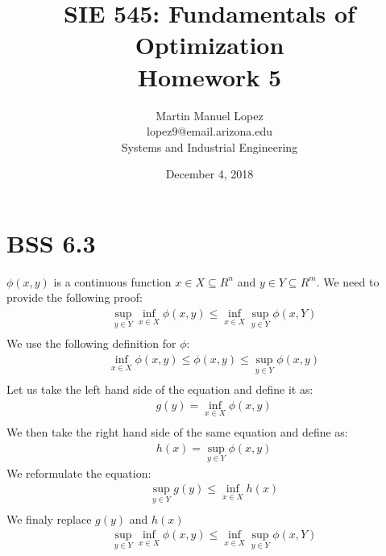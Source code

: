 \documentclass[12pt]{article}
\begin{document}
\title{SIE 545: Fundamentals of Optimization \\Homework 5}
\author{Martin Manuel Lopez \\lopez9@email.arizona.edu \\Systems and Industrial Engineering}
\date{December 4, 2018}
\maketitle
\section{BSS 6.3}
    $\phi(x,y)$ is a continuous function $x \in X \subseteq R^n $ and $y \in Y \subseteq R^m$. We need to provide the following proof:\\
        \begin{align*}
            &\sup_{y \in Y} \inf_{x \in X} \phi(x,y) \leq \inf_{x \in X} \sup_{y \in Y} \phi(x,Y)\\
        \end{align*}
    We use the following definition for $\phi$: \\
        \begin{align*}
            &\inf_{x \in X} \phi(x,y) \leq \phi(x,y) \leq \sup_{y \in Y} \phi(x,y)\\
        \end{align*}
    Let us take the left hand side of the equation and define it as:\\
        \begin{align*}
            &g(y) = \inf_{x \in X} \phi (x,y) \\ 
        \end{align*}
    We then take the right hand side of the same equation and define as:\\ 
        \begin{align*}
            &h(x) = \sup_{y \in Y} \phi (x,y)
        \end{align*}
    We reformulate the equation: \\
        \begin{align*}
            &\sup_{y \in Y} g(y) \leq \inf_{x \in X} h(x)\\
        \end{align*}
    We finaly replace $g(y)$ and $h(x)$\\
        \begin{align*}
             &\sup_{y \in Y} \inf_{x \in X} \phi(x,y) \leq \inf_{x \in X} \sup_{y \in Y} \phi(x,Y)\\
        \end{align*}
\end{document}
